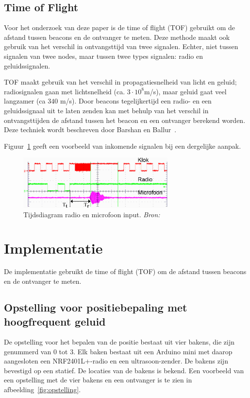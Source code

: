 \documentclass[a4paper,10pt]{article}
\begin{document}
\subsection{Time of Flight}
Voor het onderzoek van deze paper is de time of flight (TOF) gebruikt om de afstand tussen beacons en de ontvanger te meten. Deze methode maakt ook gebruik van het verschil in ontvangsttijd van twee signalen. Echter, niet tussen signalen van twee nodes, maar tussen twee types signalen: radio en geluidssignalen.

TOF maakt gebruik van het verschil in propagatiesnelheid van licht en geluid; radiosignalen gaan met lichtsnelheid (ca. $3\cdot 10^{8}$m/s), maar geluid gaat veel langzamer (ca $340$ m/s). Door beacons tegelijkertijd een radio- en een geluidssignaal uit te laten zenden kan met behulp van het verschil in ontvangsttijden de afstand tussen het beacon en een ontvanger berekend worden. Deze techniek wordt beschreven door Barshan en Ballur~\cite{barshan2000fast}.

Figuur~\ref{fig:tijdsdiagram} geeft een voorbeeld van inkomende signalen bij een dergelijke aanpak.
\begin{figure}[ht!]
    \centering
    \includegraphics[width=0.7\textwidth]{tijdsdiagram.png}
    \caption{Tijdsdiagram radio en microfoon input. \textit{Bron: \cite{park2011beacon}}}
    \label{fig:tijdsdiagram}
\end{figure}

\section{Implementatie}\label{sec:implementatie}
De implementatie gebruikt de time of flight (TOF) om de afstand tussen beacons en de ontvanger te meten.

\subsection{Opstelling voor positiebepaling met hoogfrequent geluid}
De opstelling voor het bepalen van de positie bestaat uit vier bakens, die zijn genummerd van 0 tot 3. Elk baken bestaat uit een Arduino mini met daarop aangesloten een NRF2401L+-radio en een ultrasoon-zender. De bakens zijn bevestigd op een statief. De locaties van de bakens is bekend. Een voorbeeld van een opstelling met de vier bakens en een ontvanger is te zien in afbeelding~\ref{fig:opstelling}.
\end{document}

